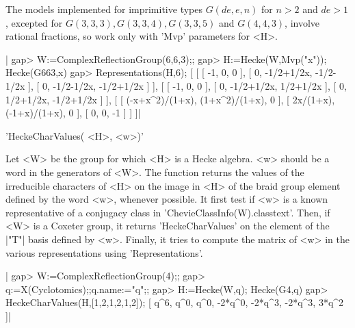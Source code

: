 The  models  implemented  for  imprimitive  types $G(de,e,n)$ for $n>2$ and
$de>1$,  excepted  for  $G(3,3,3),  G(3,3,4),  G(3,3,5)$  and  $ G(4,4,3)$,
involve rational fractions, so work only with 'Mvp' parameters for <H>.

|    gap> W:=ComplexReflectionGroup(6,6,3);;
    gap> H:=Hecke(W,Mvp("x"));
    Hecke(G663,x)
    gap> Representations(H,6);
    [ [ [ -1, 0, 0 ], [ 0, -1/2+1/2x, -1/2-1/2x ], 
          [ 0, -1/2-1/2x, -1/2+1/2x ] ], 
      [ [ -1, 0, 0 ], [ 0, -1/2+1/2x, 1/2+1/2x ], 
          [ 0, 1/2+1/2x, -1/2+1/2x ] ], 
      [ [ (-x+x^2)/(1+x), (1+x^2)/(1+x), 0 ], 
          [ 2x/(1+x), (-1+x)/(1+x), 0 ], [ 0, 0, -1 ] ] ]|
 

'HeckeCharValues( <H>, <w>)'

Let <W> be the group for which <H> is a Hecke algebra. <w> should be a word
in  the  generators  of  <W>.  The  function  returns  the  values  of  the
irreducible  characters  of  <H>  on  the  image  in <H> of the braid group
element defined by the word <w>, whenever possible. It first test if <w> is
a known representative of a conjugacy class in
'ChevieClassInfo(W).classtext'. Then, if <W> is a Coxeter group, it returns
'HeckeCharValues'  on  the  element  of  the  |"T"|  basis  defined by <w>.
Finally,   it  tries  to   compute  the  matrix   of  <w>  in  the  various
representations using 'Representations'.

|    gap> W:=ComplexReflectionGroup(4);;
    gap> q:=X(Cyclotomics);;q.name:="q";;
    gap> H:=Hecke(W,q);
    Hecke(G4,q)
    gap> HeckeCharValues(H,[1,2,1,2,1,2]);
    [ q^6, q^0, q^0, -2*q^0, -2*q^3, -2*q^3, 3*q^2 ]|

